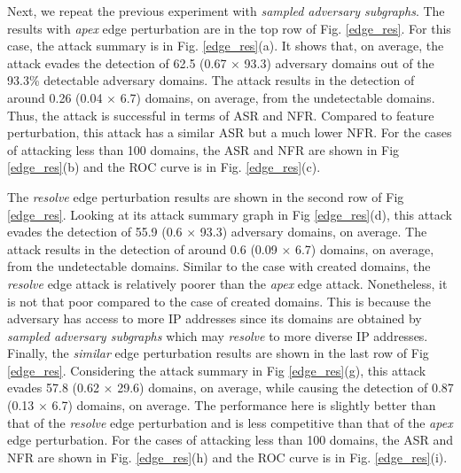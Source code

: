 \documentclass[conference,compsoc]{IEEEtran}
\begin{document}
\par Next, we repeat the previous experiment with \textit{sampled adversary subgraphs}. The results with \textit{apex} edge perturbation are in the top row of Fig. \ref{edge_res}. For this case, the attack summary is in Fig. \ref{edge_res}(a). It shows that, on average, the attack evades the detection of 62.5 (0.67 $\times$ 93.3) adversary domains out of the 93.3\% detectable adversary domains. The attack results in the detection of around 0.26 (0.04 $\times$ 6.7) domains, on average, from the undetectable domains. Thus, the attack is successful in terms of ASR and NFR. Compared to feature perturbation, this attack has a similar ASR but a much lower NFR. For the cases of attacking less than 100 domains, the ASR and NFR are shown in Fig \ref{edge_res}(b) and the ROC curve is in Fig. \ref{edge_res}(c).

\par The \textit{resolve} edge perturbation results are shown in the second row of Fig \ref{edge_res}. Looking at its attack summary graph in Fig \ref{edge_res}(d), this attack evades the detection of 55.9 (0.6 $\times$ 93.3) adversary domains, on average. The attack results in the detection of around 0.6 (0.09 $\times$ 6.7) domains, on average, from the undetectable domains. Similar to the case with created domains, the \textit{resolve} edge attack is relatively poorer than the \textit{apex} edge attack. Nonetheless, it is not that poor compared to the case of created domains. This is because the adversary has access to more IP addresses since its domains are obtained by \textit{sampled adversary subgraphs} which may \textit{resolve} to more diverse IP addresses. Finally, the \textit{similar} edge perturbation results are shown in the last row of Fig \ref{edge_res}. Considering the attack summary in Fig \ref{edge_res}(g), this attack evades 57.8 (0.62 $\times$ 29.6) domains, on average, while causing the detection of 0.87 (0.13 $\times$ 6.7) domains, on average. The performance here is slightly better than that of the \textit{resolve} edge perturbation and is less competitive than that of the \textit{apex} edge perturbation. For the cases of attacking less than 100 domains, the ASR and NFR are shown in Fig. \ref{edge_res}(h) and the ROC curve is in Fig. \ref{edge_res}(i).
\end{document}
